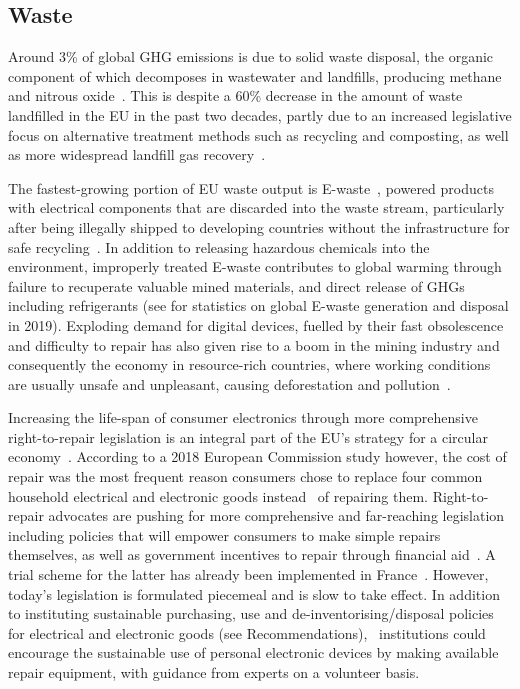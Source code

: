 \documentclass[../SustainableHEP.tex]{subfiles}
\begin{document}


\subsection{Waste}
\label{subsec:Waste}
Around 3\% of global GHG emissions is due to solid waste disposal, the organic component of which decomposes in wastewater and landfills, producing methane and nitrous oxide~\cite{owidco2andothergreenhousegasemissions}.  This is despite a 60\% decrease in the amount of waste landfilled in the EU in the past two decades, partly due to an increased legislative focus on alternative treatment methods such as recycling and composting, as well as more widespread landfill gas recovery~\cite{Eurostat}.

The fastest-growing portion of EU waste output is E-waste~\cite{EUNews}, powered products with electrical components that are discarded into the waste stream, particularly after being illegally shipped to developing countries without the infrastructure for safe recycling~\cite{Forti2020, OECDLib}.  In addition to releasing hazardous
chemicals into the environment, improperly treated E-waste contributes to global warming through failure to recuperate valuable mined materials,  and direct release of GHGs including refrigerants (see  for statistics on global E-waste generation and disposal in 2019). Exploding demand for digital devices, fuelled by their fast obsolescence and difficulty to repair has also given rise to a boom in the mining industry and consequently the economy in resource-rich countries, where working conditions are usually unsafe and unpleasant, causing deforestation and pollution~\cite{OECDLib}.

Increasing the life-span of consumer electronics through more comprehensive right-to-repair 
legislation is an integral part of the EU's strategy for a circular economy~\cite{EUNews,EUR2RSummary}.  According to a 2018 European Commission study however, the cost of repair was the most frequent reason consumers chose to replace four common household electrical and electronic goods instead~\cite{ECConsumerStudy} of repairing them. 
Right-to-repair advocates are pushing for more comprehensive and far-reaching legislation including policies that will empower consumers to make simple repairs themselves, as well as government incentives to repair through \eg financial aid~\cite{R2RPolicy}. A trial scheme for the latter has already been implemented in France~\cite{FrenchRepairAid}.  However, today's legislation is formulated piecemeal and is slow to take effect.  In addition to instituting sustainable purchasing, use and de-inventorising/disposal policies for electrical and electronic goods (see Recommendations), \ACR\ institutions could encourage the sustainable use of personal electronic devices by making available repair equipment, with guidance from experts on a volunteer basis.
\end{document}
